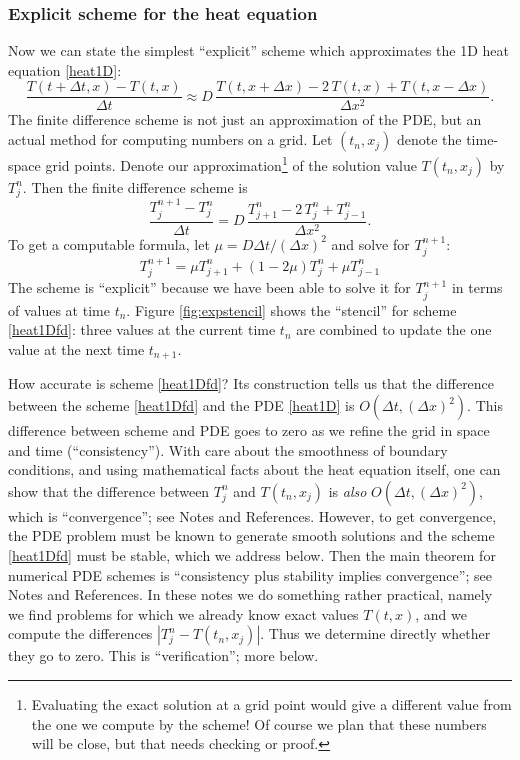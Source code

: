\documentclass[titlepage,a4paper,final,12pt]{scrartcl}
\begin{document}
\subsubsection*{Explicit scheme for the heat equation}  Now we can state the simplest ``explicit'' scheme which approximates the 1D heat equation \eqref{heat1D}:
	$$\frac{T(t+\Delta t,x) - T(t,x)}{\Delta t} \approx D\,\frac{T(t,x+\Delta x) - 2\, T(t,x) + T(t,x-\Delta x)}{\Delta x^2}.$$
The finite difference scheme is not just an approximation of the PDE, but an actual method for computing numbers on a grid.  Let $(t_n,x_j)$ denote the time-space grid points.  Denote our approximation\footnote{Evaluating the exact solution at a grid point would give a different value from the one we compute by the scheme!  Of course we plan that these numbers will be close, but that needs checking or proof.} of the solution value $T(t_n,x_j)$ by $T_j^n$.  Then the finite difference scheme is
	$$\frac{T_j^{n+1} - T_j^n}{\Delta t} = D\,\frac{T_{j+1}^n - 2\, T_j^n + T_{j-1}^n}{\Delta x^2}.$$
To get a computable formula, let $\mu = D \Delta t / (\Delta x)^2$ and solve for $T_j^{n+1}$:
\begin{equation}
  T_j^{n+1} = \mu T_{j+1}^n + (1 - 2 \mu) T_j^n + \mu T_{j-1}^n \label{heat1Dfd}
\end{equation}
The scheme is ``explicit'' because we have been able to solve it for $T_j^{n+1}$ in terms of values at time $t_n$.  Figure \ref{fig:expstencil} shows the ``stencil'' for scheme \eqref{heat1Dfd}: three values at the current time $t_n$ are combined to update the one value at the next time $t_{n+1}$.

How accurate is scheme \eqref{heat1Dfd}?  Its construction tells us that the difference between the scheme \eqref{heat1Dfd} and the PDE \eqref{heat1D} is $O(\Delta t,(\Delta x)^2)$.  This difference between scheme and PDE goes to zero as we refine the grid in space and time (``consistency'').  With care about the smoothness of boundary conditions, and using mathematical facts about the heat equation itself, one can show that the difference between $T_j^n$ and $T(t_n,x_j)$ is \emph{also} $O(\Delta t,(\Delta x)^2)$, which is ``convergence''; see Notes and References.  However, to get convergence, the PDE problem must be known to generate smooth solutions and the scheme \eqref{heat1Dfd} must be stable, which we address below.  Then the main theorem for numerical PDE schemes is ``consistency plus stability implies convergence''; see Notes and References.  In these notes we do something rather practical, namely we find problems for which we already know exact values $T(t,x)$, and we compute the differences $|T_j^n - T(t_n,x_j)|$.  Thus we determine directly whether they go to zero.  This is ``verification''; more below.
\end{document}
